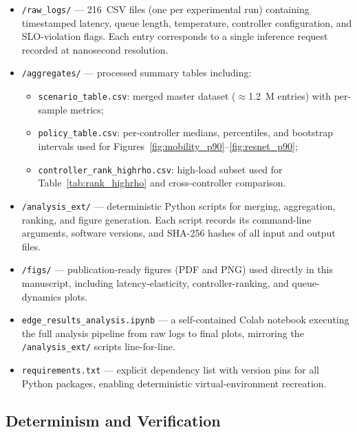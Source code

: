 \documentclass[acmsmall]{acmart}
\begin{document}
\begin{itemize}
  \item \texttt{/raw\_logs/} — 216~CSV files (one per experimental run) containing timestamped latency, queue length, temperature, controller configuration, and SLO-violation flags.  
        Each entry corresponds to a single inference request recorded at nanosecond resolution.
  \item \texttt{/aggregates/} — processed summary tables including:
        \begin{itemize}
          \item \texttt{scenario\_table.csv}: merged master dataset ($\approx$1.2~M entries) with per-sample metrics;
          \item \texttt{policy\_table.csv}: per-controller medians, percentiles, and bootstrap intervals used for Figures~\ref{fig:mobility_p90}–\ref{fig:resnet_p90};
          \item \texttt{controller\_rank\_highrho.csv}: high-load subset used for Table~\ref{tab:rank_highrho} and cross-controller comparison.
        \end{itemize}
  \item \texttt{/analysis\_ext/} — deterministic Python scripts for merging, aggregation, ranking, and figure generation.  
        Each script records its command-line arguments, software versions, and SHA-256 hashes of all input and output files.
  \item \texttt{/figs/} — publication-ready figures (PDF and PNG) used directly in this manuscript, including latency-elasticity, controller-ranking, and queue-dynamics plots.
  \item \texttt{edge\_results\_analysis.ipynb} — a self-contained Colab notebook executing the full analysis pipeline from raw logs to final plots, mirroring the \texttt{/analysis\_ext/} scripts line-for-line.
  \item \texttt{requirements.txt} — explicit dependency list with version pins for all Python packages, enabling deterministic virtual-environment recreation.
\end{itemize}

\subsection{Determinism and Verification}
\end{document}
